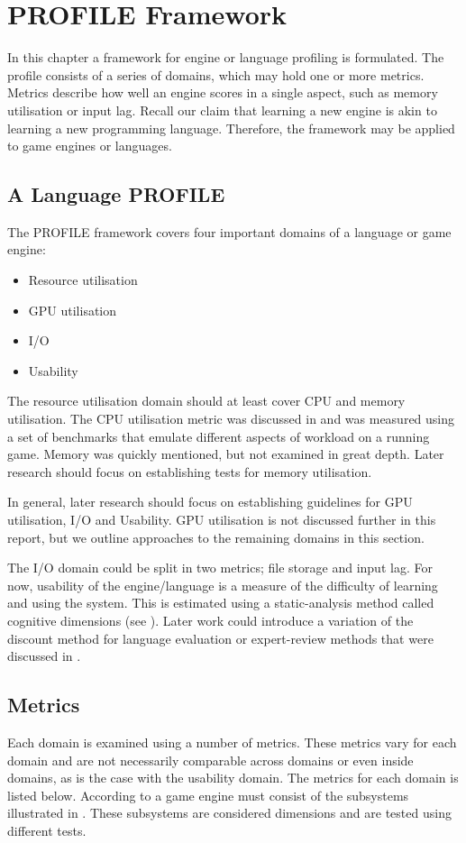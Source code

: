 \chapter{PROFILE Framework}
In this chapter a framework for engine or language profiling is formulated. The profile consists of a series of domains, which may hold one or more metrics. Metrics describe how well an engine scores in a single aspect, such as memory utilisation or input lag. 
Recall our claim that learning a new engine is akin to learning a new programming language. Therefore, the framework may be applied to game engines or languages.

\section{A Language PROFILE}
The \ac{PROFILE} framework covers four important domains of a language or game engine: 
\begin{itemize}
    \item Resource utilisation
    \item \ac{GPU} utilisation
    \item \ac{I/O}
    \item Usability
\end{itemize}
The resource utilisation domain should at least cover \ac{CPU} and memory utilisation. The \ac{CPU} utilisation metric was discussed in  and was measured using a set of benchmarks that emulate different aspects of workload on a running game. Memory was quickly mentioned, but not examined in great depth. Later research should focus on establishing tests for memory utilisation.

In general, later research should focus on establishing guidelines for \ac{GPU} utilisation, \ac{I/O} and Usability. \ac{GPU} utilisation is not discussed further in this report, but we outline approaches to the remaining domains in this section. 

The \ac{I/O} domain could be split in two metrics; file storage and input lag. For now, usability of the engine/language is a measure of the difficulty of learning and using the system. This is estimated using a static-analysis method called cognitive dimensions (see ). Later work could introduce a variation of the discount method for language evaluation or expert-review methods that were discussed in .

\section{Metrics} \label{sec:metrics}
Each domain is examined using a number of metrics. These metrics vary for each domain and are not necessarily comparable across domains or even inside domains, as is the case with the usability domain. The metrics for each domain is listed below. According to \cite{5962102} a game engine must consist of the subsystems illustrated in . These subsystems are considered dimensions and are tested using different tests.

